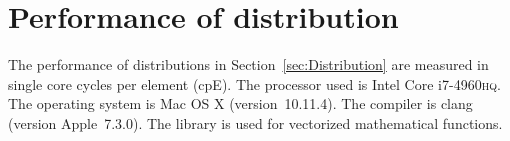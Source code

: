 %
%
%
%

\chapter{Performance of distribution}
\label{chap:Performance of distribution}

The performance of distributions in Section~\ref{sec:Distribution} are measured
in single core cycles per element (cpE). The processor used is Intel Core
i7-4960\textsc{hq}. The operating system is Mac OS X (version~10.11.4). The
compiler is \llvm{} clang (version Apple~7.3.0). The \mkl library is used for
vectorized mathematical functions.

